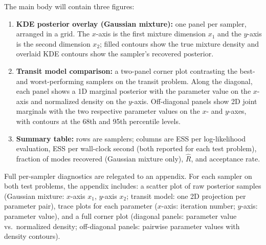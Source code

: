 \documentclass{article}
\begin{document}
The main body will contain three figures:
\begin{enumerate}
    \item \textbf{KDE posterior overlay (Gaussian mixture):} one panel per sampler, arranged
      in a grid. The $x$-axis is the first mixture dimension $x_1$ and the $y$-axis is the
      second dimension $x_2$; filled contours show the true mixture density and overlaid KDE
      contours show the sampler's recovered posterior.
    \item \textbf{Transit model comparison:} a two-panel corner plot contrasting the best-
      and worst-performing samplers on the transit problem. Along the diagonal, each panel
      shows a 1D marginal posterior with the parameter value on the $x$-axis and normalized
      density on the $y$-axis. Off-diagonal panels show 2D joint marginals with the two
      respective parameter values on the $x$- and $y$-axes, with contours at the 68th and
      95th percentile levels.
    \item \textbf{Summary table:} rows are samplers; columns are ESS per log-likelihood
      evaluation, ESS per wall-clock second (both reported for each test problem),
      fraction of modes recovered (Gaussian mixture only), $\hat{R}$, and acceptance rate.
\end{enumerate}

Full per-sampler diagnostics are relegated to an appendix. For each sampler on both test
problems, the appendix includes: a scatter plot of raw posterior samples (Gaussian mixture:
$x$-axis $x_1$, $y$-axis $x_2$; transit model: one 2D projection per parameter pair),
trace plots for each parameter ($x$-axis: iteration number; $y$-axis: parameter value),
and a full corner plot (diagonal panels: parameter value vs.\ normalized density; off-diagonal
panels: pairwise parameter values with density contours).



\end{document}

